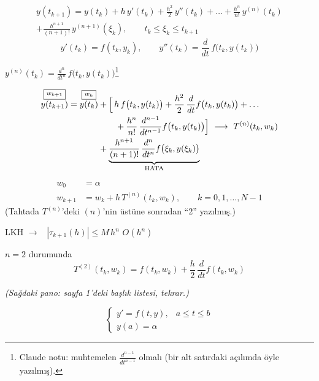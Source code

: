 \documentclass[11pt,a4paper]{article}
\begin{document}
\begin{multline*}
  y(t_{k+1}) = y(t_k) + h\,y'(t_k) + \frac{h^2}{2}\,y''(t_k) + \dots + \frac{h^n}{n!}\,y^{(n)}(t_k) \\
  + \frac{h^{n+1}}{(n+1)!}\,y^{(n+1)}(\xi_k), \qquad t_k \le \xi_k \le t_{k+1}
\end{multline*}
\[ y'(t_k) = f(t_k, y_k), \qquad y''(t_k) = \frac{d}{dt}\, f\bigl(t_k, y(t_k)\bigr) \]
\begin{center}
  $\displaystyle y^{(n)}(t_k) = \frac{d^n}{dt^n}\, f\bigl(t_k, y(t_k)\bigr)$\footnote{Claude notu:
  muhtemelen $\frac{d^{n-1}}{dt^{n-1}}$ olmalı (bir alt satırdaki açılımda öyle yazılmış).}
\end{center}
\begin{align*}
  \overset{\fbox{$\scriptstyle w_{k+1}$}}{y(t_{k+1})} = \overset{\fbox{$\scriptstyle w_k$}}{y(t_k)}
  &+ \Bigl[\, h\,f\bigl(t_k, y(t_k)\bigr) + \frac{h^2}{2}\,\frac{d}{dt} f\bigl(t_k, y(t_k)\bigr) + \dots \\
  &\qquad + \frac{h^n}{n!}\,\frac{d^{n-1}}{dt^{n-1}} f\bigl(t_k, y(t_k)\bigr) \Bigr]
     \ \longrightarrow\ T^{(n)}(t_k, w_k) \\
  &+ \underbrace{\frac{h^{n+1}}{(n+1)!}\,\frac{d^n}{dt^n} f\bigl(\xi_k, y(\xi_k)\bigr)}_{\text{HATA}}
\end{align*}

\begin{align*}
  w_0 &= \alpha \\
  w_{k+1} &= w_k + h\,T^{(n)}(t_k, w_k), \qquad k = 0, 1, \dots, N-1
\end{align*}
{\small (Tahtada $T^{(n)}$'deki $(n)$'nin üstüne sonradan ``2'' yazılmış.)}

LKH $\rightarrow$ \ $|\tau_{k+1}(h)| \le M\,h^n$ \qquad $O(h^n)$

$n = 2$ durumunda
\[ T^{(2)}(t_k, w_k) = f(t_k, w_k) + \frac{h}{2}\,\frac{d}{dt} f(t_k, w_k) \]

\textit{(Sağdaki pano: sayfa 1'deki başlık listesi, tekrar.)}

\[
  \begin{cases}
    y' = f(t,y), & a \le t \le b \\
    y(a) = \alpha
  \end{cases}
\]
\end{document}

